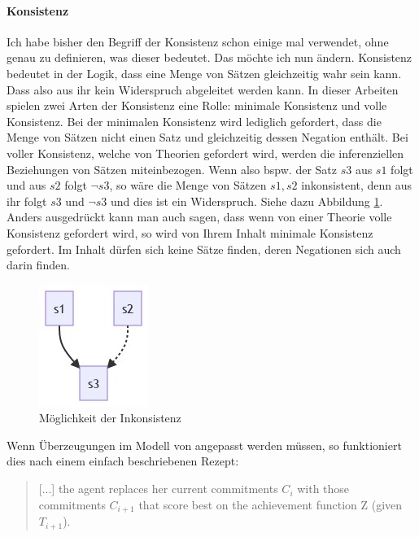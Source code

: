 \documentclass{article}
\begin{document}
\paragraph{Konsistenz\label{konsistenz}}
Ich habe bisher den Begriff der Konsistenz schon einige mal verwendet, ohne genau zu definieren, was dieser bedeutet. Das möchte ich nun ändern. Konsistenz bedeutet in der Logik, dass eine Menge von Sätzen gleichzeitig wahr sein kann. Dass also aus ihr kein Widerspruch abgeleitet werden kann. In dieser Arbeiten spielen zwei Arten der Konsistenz eine Rolle: minimale Konsistenz und volle Konsistenz. Bei der minimalen Konsistenz wird lediglich gefordert, dass die Menge von Sätzen nicht einen Satz und gleichzeitig dessen Negation enthält. Bei voller Konsistenz, welche von Theorien gefordert wird, werden die inferenziellen Beziehungen von Sätzen miteinbezogen. Wenn also bspw. der Satz $s3$ aus $s1$ folgt und aus $s2$ folgt $\neg s3$, so wäre die Menge von Sätzen ${s1,s2}$ inkonsistent, denn aus ihr folgt $s3$ und $\neg s3$ und dies ist ein Widerspruch. Siehe dazu Abbildung \ref{fig:inconsistency}. Anders ausgedrückt kann man auch sagen, dass wenn von einer Theorie volle Konsistenz gefordert wird, so wird von Ihrem Inhalt minimale Konsistenz gefordert. Im Inhalt dürfen sich keine Sätze finden, deren Negationen sich auch darin finden.

\begin{figure}[ht]
  \centering
  \includegraphics{consistence.png}
  \caption{Möglichkeit der Inkonsistenz\label{fig:inconsistency}}
\end{figure}

Wenn Überzeugungen im Modell von \citeauthor{beisbart_making_2015} angepasst werden müssen, so funktioniert dies nach einem einfach beschriebenen Rezept:

\begin{quote}
    [...] the agent replaces her current commitments $C_i$ with those commitments $C_{i+1}$ that score best on the achievement function Z (given $T_{i+1}$).
    \autocite[S.~11]{beisbart_making_2015}
\end{quote}
\end{document}
